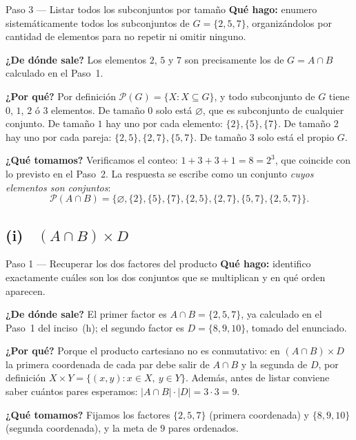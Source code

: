 \documentclass[11pt]{article}
\begin{document}
\begin{paso}{Paso 3 --- Listar todos los subconjuntos por tamaño}
\textbf{Qué hago:} enumero sistemáticamente todos los subconjuntos de $G=\{2,5,7\}$,
organizándolos por cantidad de elementos para no repetir ni omitir ninguno.

\textbf{¿De dónde sale?} Los elementos $2$, $5$ y $7$ son precisamente los de $G=A\cap B$
calculado en el Paso~1.

\textbf{¿Por qué?} Por definición $\mathcal{P}(G)=\{X: X\subseteq G\}$, y todo subconjunto de
$G$ tiene $0$, $1$, $2$ ó $3$ elementos. De tamaño $0$ solo está $\varnothing$, que es
subconjunto de cualquier conjunto. De tamaño $1$ hay uno por cada elemento: $\{2\},\{5\},
\{7\}$. De tamaño $2$ hay uno por cada pareja: $\{2,5\},\{2,7\},\{5,7\}$. De tamaño $3$ solo
está el propio $G$.

\textbf{¿Qué tomamos?} Verificamos el conteo: $1+3+3+1=8=2^{3}$, que coincide con lo previsto
en el Paso~2. La respuesta se escribe como un conjunto \emph{cuyos elementos son conjuntos}:
\[
\mathcal{P}(A\cap B)=\bigl\{\varnothing,\{2\},\{5\},\{7\},\{2,5\},\{2,7\},\{5,7\},\{2,5,7\}\bigr\}.
\]
\end{paso}

\subsection*{(i) \ $(A\cap B)\times D$}

\begin{paso}{Paso 1 --- Recuperar los dos factores del producto}
\textbf{Qué hago:} identifico exactamente cuáles son los dos conjuntos que se multiplican y en
qué orden aparecen.

\textbf{¿De dónde sale?} El primer factor es $A\cap B=\{2,5,7\}$, ya calculado en el Paso~1
del inciso~(h); el segundo factor es $D=\{8,9,10\}$, tomado del enunciado.

\textbf{¿Por qué?} Porque el producto cartesiano no es conmutativo: en $(A\cap B)\times D$ la
primera coordenada de cada par debe salir de $A\cap B$ y la segunda de $D$, por definición
$X\times Y=\{(x,y): x\in X,\ y\in Y\}$. Además, antes de listar conviene saber cuántos pares
esperamos: $|A\cap B|\cdot|D|=3\cdot 3=9$.

\textbf{¿Qué tomamos?} Fijamos los factores $\{2,5,7\}$ (primera coordenada) y $\{8,9,10\}$
(segunda coordenada), y la meta de $9$ pares ordenados.
\end{paso}
\end{document}
